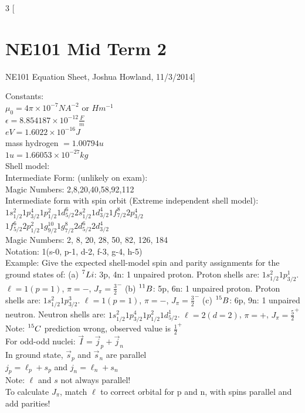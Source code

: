 \documentclass{article}
\begin{document}
\begin{multicols}{3}
[
\section{NE101 Mid Term 2}
NE101 Equation Sheet, Joshua Howland, 11/3/2014]

Constants:\\
$\mu_{0} = 4 \pi \times 10 ^{-7} NA^{-2}$ or $Hm^{-1} $\\
$\epsilon = 8.854187 \times 10 ^{-12} \frac{F}{m}$\\	
$eV = 1.6022\times 10 ^{-16} J$\\
mass hydrogen $ = 1.00794u  $\\
$1u = 1.66053 \times 10^{-27} kg $\\

Shell model:\\
Intermediate Form: (unlikely on exam):\\
Magic Numbers: 2,8,20,40,58,92,112 \\

Intermediate form with spin orbit (Extreme independent shell model):\\
$1s_{1/2}^{2} 1p_{3/2}^{4} 1p_{1/2}^{2} 1d_{5/2}^{6} 2s_{1/2}^{2} 1d_{3/2}^{4} 1f_{7/2}^{8} 2p_{3/2}^{4} $\\
$1f_{5/2}^{6} 2p_{1/2}^{2} 1g_{9/2}^{10} 1g_{7/2}^{8} 2d_{5/2}^{6} 2d_{3/2}^{4}$\\
Magic Numbers: 2, 8, 20, 28, 50, 82, 126, 184\\
Notation: 1(s-0, p-1, d-2, f-3, g-4, h-5)\\

Example: Give the expected shell-model spin and parity assignments for the ground states of: (a) $ \prescript{7}{}{Li} $: 3p, 4n: 1 unpaired proton.  Proton shells are: $1s_{1/2}^{2}1p_{3/2}^{1}$.  $\ell = 1 (p=1)$, $\pi = -$, $J_{\pi} = \frac{3}{2}^{-}$ (b) $ \prescript{11}{}{B} $: 5p, 6n: 1 unpaired proton.  Proton shells are: $1s_{1/2}^{2}1p_{3/2}^{3}$.  $\ell = 1 (p=1)$, $\pi = -$, $J_{\pi} = \frac{3}{2}^{-}$ (c) $ \prescript{15}{}{B} $: 6p, 9n: 1 unpaired neutron.  Neutron shells are: $1s_{1/2}^{2}1p_{3/2}^{4}1p_{1/2}^{2}1d_{5/2}^{1}$.  $\ell = 2(d=2)$, $\pi = +$, $J_{\pi} = \frac{5}{2}^{+}$ Note: $\prescript{15}{}{C}$ prediction wrong, observed value is $\frac{1}{2}^{+}$\\
For odd-odd nuclei: $\vec{I} = \vec{j}_{p} + \vec{j}_{n}$\\
In ground state, $\vec{s}_{p}$ and $\vec{s}_{n}$ are parallel\\
$j_{p} = \ell_{p} + s_{p}$ and $j_{n} = \ell_{n} + s_{n}$\\
Note: $\ell$ and $s$ not always parallel!\\
To calculate $J_{\pi}$, match $\ell$ to correct orbital for p and n, with spins parallel and add parities!\\


\end{multicols}
\end{document}
